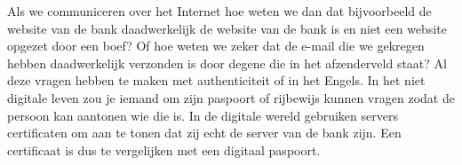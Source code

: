 Als we communiceren over het Internet hoe weten we dan dat bijvoorbeeld de website van de bank daadwerkelijk de website van de bank is en niet een website opgezet door een boef? Of hoe weten we zeker dat de e-mail die we gekregen hebben daadwerkelijk verzonden is door degene die in het afzenderveld staat? Al deze vragen hebben te maken met authenticiteit of  in het Engels. In het niet digitale leven zou je iemand om zijn paspoort of rijbewijs kunnen vragen zodat de persoon kan aantonen wie die is. In de digitale wereld gebruiken servers certificaten om aan te tonen dat zij echt de server van de bank zijn. Een certificaat is dus te vergelijken met een digitaal paspoort.
